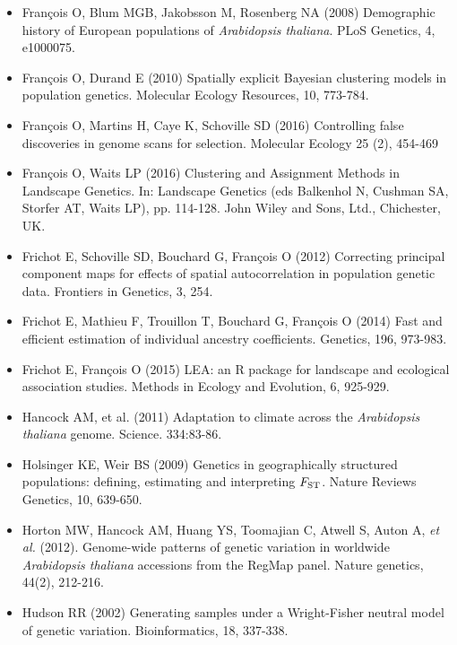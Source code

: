 \begin{itemize}
\item[] Fran\c cois O, Blum MGB, Jakobsson M, Rosenberg NA (2008) Demographic history of European populations of {\it Arabidopsis thaliana}. PLoS Genetics, 4, e1000075.

\item[] Fran\c cois O, Durand E (2010) Spatially explicit Bayesian clustering models in population genetics. Molecular Ecology Resources, 10, 773-784.

\item[] Fran\c cois O,  Martins H, Caye K, Schoville SD (2016) Controlling false discoveries in genome scans for selection. Molecular Ecology 25 (2), 454-469

\item[] Fran\c cois O,  Waits LP (2016) Clustering and Assignment Methods in Landscape Genetics. In: Landscape Genetics (eds Balkenhol N, Cushman SA, Storfer AT, Waits LP), pp. 114-128. John Wiley and Sons, Ltd., Chichester, UK.

\item[] Frichot E, Schoville SD, Bouchard G, Fran\c cois O (2012) Correcting principal component maps for effects of spatial autocorrelation in population genetic data. Frontiers in Genetics, 3, 254.

\item[] Frichot E, Mathieu F, Trouillon T, Bouchard G, Fran\c cois O (2014) Fast and efficient estimation of individual ancestry coefficients. Genetics, 196, 973-983.

\item[] Frichot E, Fran\c cois O (2015) LEA: an R package for landscape and ecological association studies. Methods in Ecology and Evolution, 6, 925-929.

\item[] Hancock AM, et al. (2011) Adaptation to climate across the {\it Arabidopsis thaliana} genome. Science. 334:83-86.

\item[] Holsinger KE, Weir BS (2009) Genetics in geographically structured populations: defining, estimating and interpreting $F_{\rm ST}$. Nature Reviews Genetics, 10, 639-650.

\item[] Horton MW, Hancock AM, Huang YS, Toomajian C, Atwell S, Auton A, {\it et al.} (2012). Genome-wide patterns of genetic variation in worldwide {\it Arabidopsis thaliana} accessions from the RegMap panel. Nature genetics, 44(2), 212-216.

\item[] Hudson RR (2002) Generating samples under a Wright-Fisher neutral model of genetic variation. Bioinformatics, 18, 337-338.


\end{itemize}
